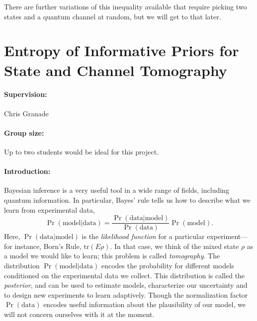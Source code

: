 \documentclass[aps,pra,onecolumn,nofootinbib,superscriptaddress,tightenlines,
notitlepage,12pt]{revtex4-1}
\newcommand{\tr}{\mathrm{tr}}
\begin{document}
There are further variations of this inequality available that require picking two states and a quantum channel at random, but we will get to that later. 

\section{Entropy of Informative Priors for State and Channel Tomography}

\paragraph*{Supervision:} Chris Granade

\paragraph*{Group size:} Up to two students would be ideal for this project.

\paragraph*{Introduction:} Bayesian inference is a very useful tool in a wide range of fields, including quantum information. In particular, Bayes' rule tells us how to describe what we learn from experimental data,
\begin{equation}\label{bayes}
  \Pr(\text{model} | \text{data}) = \frac{\Pr(\text{data} | \text{model})}{\Pr(\text{data})} \Pr(\text{model}).
\end{equation}
Here, $\Pr(\text{data} | \text{model})$ is the \emph{likelihood function} for
a particular experiment--- for instance, Born's Rule, $\tr(E \rho)$. In that
case, we think of the mixed state $\rho$ as a model we would like to learn;
this problem is called \emph{tomography}. The distribution $\Pr(\text{model} |
\text{data})$ encodes the probability for different models conditioned on the
experimental data we collect. This distribution is called the
\emph{posterior}, and can be used to estimate models, characterize our
uncertainty and to design new experiments to learn adaptively. Though the
normalization factor $\Pr(\text{data})$ encodes useful information about the
plausibility of our model, we will not concern ourselves with it at the moment.
\end{document}
